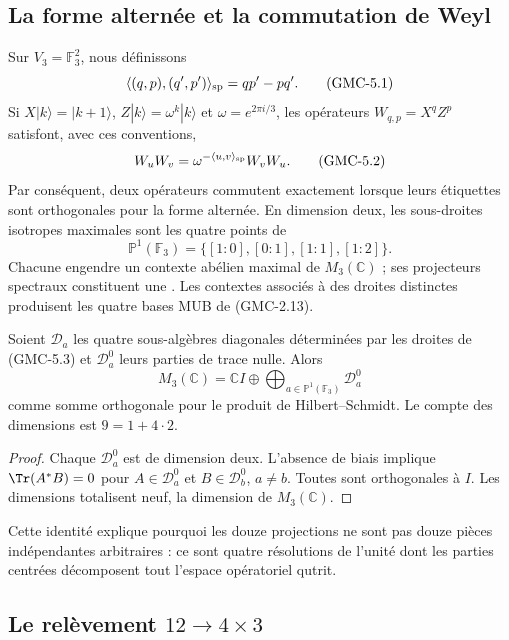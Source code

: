 \subsection{La forme alternée et la commutation de Weyl}

Sur $V_3=\mathbb F_3^2$, nous définissons
\[
 \langle(q,p),(q',p')\rangle_{\rm sp}=qp'-pq'.
 \tag{GMC-5.1}
\]
Si $X|k\rangle=|k+1\rangle$,
$Z|k\rangle=\omega^k|k\rangle$ et $\omega=e^{2\pi i/3}$, les opérateurs
$W_{q,p}=X^qZ^p$ satisfont, avec ces conventions,
\[
 W_uW_v=\omega^{-\langle u,v\rangle_{\rm sp}}W_vW_u.
 \tag{GMC-5.2}
\]
Par conséquent, deux opérateurs commutent exactement lorsque leurs étiquettes sont
orthogonales pour la forme alternée. En dimension deux, les sous-droites
isotropes maximales sont les quatre points de
\[
 \mathbb P^1(\mathbb F_3)=\{[1:0],[0:1],[1:1],[1:2]\}.
 \tag{GMC-5.3}
\]
Chacune engendre un contexte abélien maximal de $M_3(\mathbb C)$ ; ses
projecteurs spectraux constituent une \PVM. Les contextes associés à des droites
distinctes produisent les quatre bases MUB de \textup{(GMC-2.13)}.

\begin{proposition}
\label{p12-83-c22-s8:gmc:prop:descomposicion-masa-qutrit}
Soient $\mathcal D_a$ les quatre sous-algèbres diagonales déterminées par les
droites de \textup{(GMC-5.3)} et $\mathcal D_a^0$ leurs parties de trace nulle. Alors
\[
 M_3(\mathbb C)
 =\mathbb CI\oplus
   \bigoplus_{a\in\mathbb P^1(\mathbb F_3)}\mathcal D_a^0
 \tag{GMC-5.4}
\]
comme somme orthogonale pour le produit de Hilbert--Schmidt. Le compte des
dimensions est $9=1+4\cdot2$.
\end{proposition}

\begin{proof}
Chaque $\mathcal D_a^0$ est de dimension deux. L’absence de biais implique
$\Tr(A^*B)=0$ pour $A\in\mathcal D_a^0$ et
$B\in\mathcal D_b^0$, $a\ne b$. Toutes sont orthogonales à $I$. Les
dimensions totalisent neuf, la dimension de $M_3(\mathbb C)$.
\end{proof}

Cette identité explique pourquoi les douze projections ne sont pas douze pièces
indépendantes arbitraires : ce sont quatre résolutions de l’unité dont les parties
centrées décomposent tout l’espace opératoriel qutrit.

\subsection{Le relèvement \texorpdfstring{$12\to4\times3$}{12 vers 4 fois 3}}

